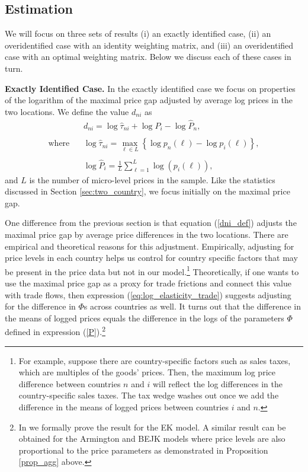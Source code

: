 \documentclass[12pt,dvips, ps2pdf]{article}
\begin{document}
\subsection{Estimation}

We will focus on three sets of results (i) an exactly identified case, (ii) an overidentified case with an identity weighting matrix, and (iii) an overidentified case with an optimal weighting matrix. Below we discuss each of these cases in turn.

\textbf{Exactly Identified Case.} In the exactly identified case we focus on properties of the logarithm of the maximal price gap adjusted by average log prices in the two locations. We define the value $d_{ni}$ as
\begin{align}
\label{dni_def}
&d_{ni} = \log \hat{\tau}_{ni}+ \log \hat{P}_i - \log \hat{P}_n ,\\
\nonumber\\
\mbox{where} \ \ \ \  &\log \hat{\tau}_{ni} = \max_{\ell \in L} \left\{ \log p_n(\ell) - \log p_i(\ell) \right \},  \nonumber \\
\nonumber\\
&\log \hat{P}_i = \frac{1}{L} \sum_{\ell = 1}^{L} \log(p_i(\ell)), \nonumber
\end{align}
and $L$ is the number of micro-level prices in the sample. Like the statistics discussed in Section \ref{sec:two_country}, we focus initially on the maximal price gap.

One difference from the previous section is that equation (\ref{dni_def}) adjusts the maximal price gap by average price differences in the two locations. There are empirical and theoretical reasons for this adjustment. Empirically, adjusting for price levels in each country helps us control for country specific factors that may be present in the price data but not in our model.\footnote{For example, suppose there are country-specific factors such as sales taxes, which are multiples of the goods' prices. Then, the maximum log price difference between countries $n$ and $i$ will reflect the log differences in the country-specific sales taxes. The tax wedge washes out once we add the difference in the means of logged prices between countries $i$ and $n$.} Theoretically, if one wants to use the maximal price gap as a proxy for trade frictions and connect this value with trade flows, then expression (\ref{eq:log_elasticity_trade}) suggests adjusting for the difference in $\Phi$s across countries as well. It turns out that the difference in the means of logged prices equals the difference in the logs of the parameters $\Phi$ defined in expression (\ref{P}).\footnote{In \citet{sw_jie}  we formally prove the result for the EK model. A similar result can be obtained for the Armington and BEJK models where price levels are also proportional to the price parameters as demonstrated in Proposition \ref{prop_agg} above.}
\end{document}
